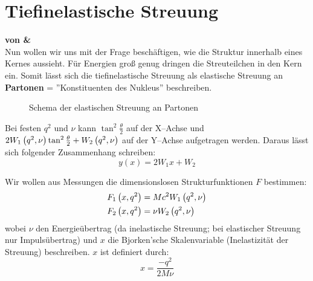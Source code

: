 \documentclass[Ex4_Zusammenfassung.tex]{subfiles}
\begin{document}
\section{Tiefinelastische Streuung}
\textbf{von \soeren \& \martina}\\

Nun wollen wir uns mit der Frage beschäftigen, wie die Struktur innerhalb eines Kernes aussieht. Für Energien groß genug dringen die Streuteilchen in den Kern ein. Somit lässt sich die tiefinelastische Streuung als elastische Streuung an \textbf{Partonen} = ''Konstituenten des Nukleus'' beschreiben.
\begin{figure}[H]
	\centering
	\caption{Schema der elastischen Streuung an Partonen}
\end{figure}

Bei festen $q^2$ und $\nu$ kann $\tan^2 \frac{\theta}{2}$ auf der X--Achse und $2W_1\left( q^2,\nu\right) \tan^2 \frac{\theta}{2} + W_2\left( q^2,\nu\right)$ auf der Y--Achse aufgetragen werden. Daraus lässt sich folgender Zusammenhang schreiben:
\begin{equation}
	y(x) = 2W_1x+W_2
\end{equation}

Wir wollen aus Messungen die dimensionslosen Strukturfunktionen $F$ bestimmen:
\begin{align}
	F_1\left( x,q^2\right) &= Mc^2 W_1\left( q^2,\nu\right)\\
	F_2\left( x,q^2\right) &= \nu W_2\left( q^2,\nu\right)
\end{align}
wobei $\nu$ den Energieübertrag (da inelastische Streuung; bei elastischer Streuung nur Impulsübertrag) und $x$ die Bjorken'sche Skalenvariable (Inelastizität der Streuung) beschreiben. $x$ ist definiert durch:
\begin{equation}
	x = \frac{-q^2}{2M\nu}
\end{equation}
\end{document}
